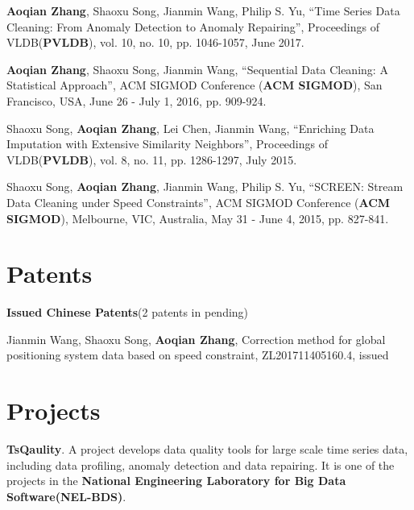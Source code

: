 \documentclass[margin]{cv}
\begin{document}
\begin{resume}
\begin{enumerate}[{[}1{]}]
\item {\bf Aoqian Zhang}, {Shaoxu Song}, {Jianmin Wang}, {Philip S. Yu}, ``Time Series Data Cleaning: From Anomaly Detection to Anomaly Repairing'', Proceedings of VLDB({\bf PVLDB}), vol. 10, no. 10, pp. 1046-1057, June 2017.

\item {\bf Aoqian Zhang}, Shaoxu Song, Jianmin Wang, ``Sequential Data Cleaning: A Statistical Approach'', ACM SIGMOD Conference ({\bf ACM SIGMOD}), San Francisco, USA, June 26 - July 1, 2016, pp. 909-924.

\item {Shaoxu Song}, {\bf Aoqian Zhang}, {Lei Chen}, {Jianmin Wang}, ``Enriching Data Imputation with Extensive Similarity Neighbors'', Proceedings of VLDB({\bf PVLDB}), vol. 8, no. 11, pp. 1286-1297, July 2015.




\item Shaoxu Song, {\bf Aoqian Zhang}, Jianmin Wang, Philip S. Yu, ``SCREEN: Stream Data Cleaning under Speed Constraints'', ACM SIGMOD Conference ({\bf ACM SIGMOD}), Melbourne, VIC, Australia, May 31 - June 4, 2015, pp. 827-841.

\end{enumerate}

\section{\sc Patents}
{\bf Issued Chinese Patents}(2 patents in pending)
\begin{enumerate}[{[}P1{]}]
\item Jianmin Wang, Shaoxu Song, {\bf Aoqian Zhang}, Correction method for global positioning system data based on speed constraint, ZL201711405160.4, issued

\end{enumerate}

\section{\sc Projects}
{\bf TsQaulity}. A project develops data quality tools for large scale time series data, including data profiling, anomaly detection and data repairing. It is one of the projects in the {\bf National Engineering Laboratory for Big Data Software(NEL-BDS)}.


\end{resume}
\end{document}
